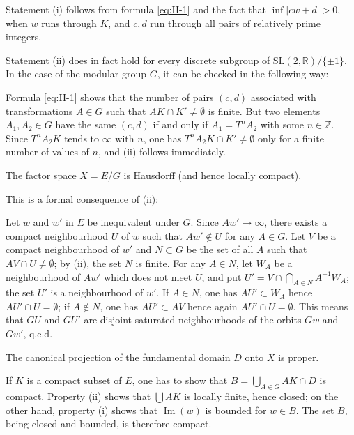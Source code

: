 Statement (i) follows from formula \eqref{eq:II-1} and the fact that
$\inf|cw+d|>0$, when $w$ runs through $K$, and $c,d$ run through all pairs
of relatively prime integers.

Statement (ii) does in fact hold for every discrete subgroup of
$\mathrm{SL}(2,\mathbb{R})/\{\pm 1\}$. In the case of the modular group
$G$, it can be checked in the following way:

Formula \eqref{eq:II-1} shows that the number of pairs $(c,d)$ associated
with transformations $A\in G$ such that $AK\cap K'\neq\emptyset$ is
finite. But two elements $A_{1},A_{2}\in G$ have the same $(c,d)$ if and
only if $A_{1}=T^{n}A_{2}$ with some $n\in\mathbb{Z}$. Since
$T^{n}A_{2}K$ tends to $\infty$ with $n$, one has
$T^{n}A_{2}K\cap K'\neq\emptyset$ only for a finite number of values of
$n$, and (ii) follows immediately.

\begin{corollary}\label{cor:II-hausdorff}
The factor space $X=E/G$ is Hausdorff (and hence locally compact).
\end{corollary}

This is a formal consequence of (ii):

Let $w$ and $w'$ in $E$ be inequivalent under $G$. Since $Aw'\to\infty$,
there exists a compact neighbourhood $U$ of $w$ such that $Aw'\notin U$
for any $A\in G$. Let $V$ be a compact neighbourhood of $w'$ and
$N\subset G$ be the set of all $A$ such that $AV\cap U\neq\emptyset$; by
(ii), the set $N$ is finite. For any $A\in N$, let $W_{A}$ be a
neighbourhood of $Aw'$ which does not meet $U$, and put
$U'=V\cap\bigcap_{A\in N}A^{-1}W_{A}$; the set $U'$ is a neighbourhood of
$w'$. If $A\in N$, one has $AU'\subset W_{A}$ hence
$AU'\cap U=\emptyset$; if $A\notin N$, one has $AU'\subset AV$ hence again
$AU'\cap U=\emptyset$. This means that $GU$ and $GU'$ are disjoint
saturated neighbourhoods of the orbits $Gw$ and $Gw'$, q.e.d.

\begin{corollary}\label{cor:II-proper}
The canonical projection of the fundamental domain $D$ onto $X$ is proper.
\end{corollary}

If $K$ is a compact subset of $E$, one has to show that
$B=\bigcup_{A\in G}AK\cap D$ is compact. Property (ii) shows that
$\bigcup AK$ is locally finite, hence closed; on the other hand, property
(i) shows that $\operatorname{Im}(w)$ is bounded for $w\in B$. The set
$B$, being closed and bounded, is therefore compact.

